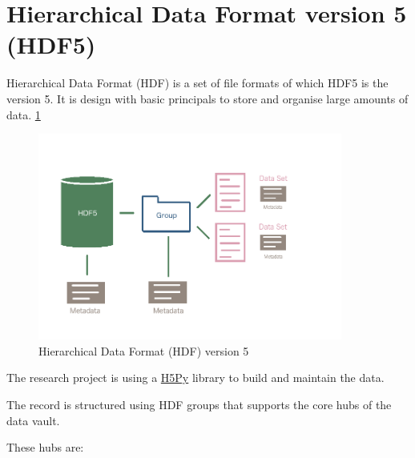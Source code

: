 \section{Hierarchical Data Format version 5 (HDF5)}

Hierarchical Data Format (HDF) is a set of file formats of which HDF5 is the version 5. It is design with basic principals to store and organise large amounts of data. \ref{fig:figHDF5} \cite{Folk2011}

\begin{figure}[H]
    \centering
    \includegraphics[width=10cm]{figures/technical/HDF5.png}
    \caption{Hierarchical Data Format (HDF) version 5}
    \label{fig:figHDF5}
\end{figure}

The research project is using a \href{https://pypi.org/project/h5py/}{H5Py} library to build and maintain the data.

The record is structured using HDF groups that supports the core hubs of the data vault.

These hubs are:

